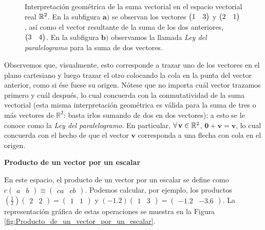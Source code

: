 \documentclass[apuntes]{subfiles}
\begin{document}
\begin{figure}[h!]
        \caption{Interpretación geométrica de la suma vectorial en el espacio vectorial real $\protect\mathbb{R}^2$. En la subfigura $\textbf{a)}$ se observan los vectores $\protect\begin{pmatrix} 1 & 3 \protect\end{pmatrix}$ y $\protect\begin{pmatrix} 2 & 1 \protect\end{pmatrix}$, así como el vector resultante de la suma de los dos anteriores, $\protect\begin{pmatrix} 3 & 4 \protect\end{pmatrix}$. En la subfigura $\textbf{b)}$ observamos la llamada \emph{Ley del paralelogramo} para la suma de dos vectores.}
    \label{fig:Suma_vectorial}
\end{figure}

    Observemos que, visualmente, esto corresponde a trazar uno de los vectores en el plano cartesiano y luego trazar el otro colocando la cola en la punta del vector anterior, como si ése fuese su origen. Nótese que no importa cuál vector trazamos primero y cuál después, lo cual concuerda con la conmutatividad de la suma vectorial (esta misma interpretación geométrica es válida para la suma de tres o más vectores de $\mathbb{R}^2$: basta irlos sumando de dos en dos vectores); a esto se le conoce como la \textit{Ley del paralelogramo}. En particular, $\forall\hspace{0.5mm} \mathbf{v} \in \mathbb{R}^2$, $\mathbf{0}+\mathbf{v}=\mathbf{v}$, lo cual concuerda con el hecho de que el vector $\mathbf{v}$ corresponda a una flecha con cola en el origen.

\vspace{3mm}
\textbf{Producto de un vector por un escalar}
\vspace{3mm}

        En este espacio, el producto de un vector por un escalar se define como $c\begin{pmatrix}a&b\end{pmatrix}\equiv\begin{pmatrix}ca&cb\end{pmatrix}$. Podemos calcular, por ejemplo, los productos $(\frac{1}{2})\begin{pmatrix}2&2\end{pmatrix}=\begin{pmatrix}1&1\end{pmatrix}$ y $(-1.2)\begin{pmatrix}1&3\end{pmatrix}=\begin{pmatrix}-1.2&-3.6\end{pmatrix}$. La representación gráfica de estas operaciones se muestra en la Figura \ref{fig:Producto_de_un_vector_por_un_escalar}.
\end{document}
